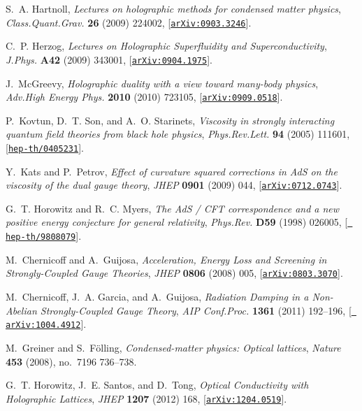 \documentclass[12pt]{article}
\begin{document}
\begin{thebibliography}{100}
S.~A. Hartnoll, {\it {Lectures on holographic methods for condensed matter
  physics}},  {\em Class.Quant.Grav.} {\bf 26} (2009) 224002,
  [\href{http://xxx.lanl.gov/abs/0903.3246}{{\tt arXiv:0903.3246}}].

C.~P. Herzog, {\it {Lectures on Holographic Superfluidity and
  Superconductivity}},  {\em J.Phys.} {\bf A42} (2009) 343001,
  [\href{http://xxx.lanl.gov/abs/0904.1975}{{\tt arXiv:0904.1975}}].

J.~McGreevy, {\it {Holographic duality with a view toward many-body physics}},
  {\em Adv.High Energy Phys.} {\bf 2010} (2010) 723105,
  [\href{http://xxx.lanl.gov/abs/0909.0518}{{\tt arXiv:0909.0518}}].

P.~Kovtun, D.~T. Son, and A.~O. Starinets, {\it {Viscosity in strongly
  interacting quantum field theories from black hole physics}},  {\em
  Phys.Rev.Lett.} {\bf 94} (2005) 111601,
  [\href{http://xxx.lanl.gov/abs/hep-th/0405231}{{\tt hep-th/0405231}}].

Y.~Kats and P.~Petrov, {\it {Effect of curvature squared corrections in AdS on
  the viscosity of the dual gauge theory}},  {\em JHEP} {\bf 0901} (2009) 044,
  [\href{http://xxx.lanl.gov/abs/0712.0743}{{\tt arXiv:0712.0743}}].

G.~T. Horowitz and R.~C. Myers, {\it {The AdS / CFT correspondence and a new
  positive energy conjecture for general relativity}},  {\em Phys.Rev.} {\bf
  D59} (1998) 026005, [\href{http://xxx.lanl.gov/abs/hep-th/9808079}{{\tt
  hep-th/9808079}}].

M.~Chernicoff and A.~Guijosa, {\it {Acceleration, Energy Loss and Screening in
  Strongly-Coupled Gauge Theories}},  {\em JHEP} {\bf 0806} (2008) 005,
  [\href{http://xxx.lanl.gov/abs/0803.3070}{{\tt arXiv:0803.3070}}].

M.~Chernicoff, J.~A. Garcia, and A.~Guijosa, {\it {Radiation Damping in a
  Non-Abelian Strongly-Coupled Gauge Theory}},  {\em AIP Conf.Proc.} {\bf 1361}
  (2011) 192--196, [\href{http://xxx.lanl.gov/abs/1004.4912}{{\tt
  arXiv:1004.4912}}].

M.~Greiner and S.~F{\"o}lling, {\it Condensed-matter physics: Optical
  lattices},  {\em Nature} {\bf 453} (2008), no.~7196 736--738.

G.~T. Horowitz, J.~E. Santos, and D.~Tong, {\it {Optical Conductivity with
  Holographic Lattices}},  {\em JHEP} {\bf 1207} (2012) 168,
  [\href{http://xxx.lanl.gov/abs/1204.0519}{{\tt arXiv:1204.0519}}].


\end{thebibliography}
\end{document}
